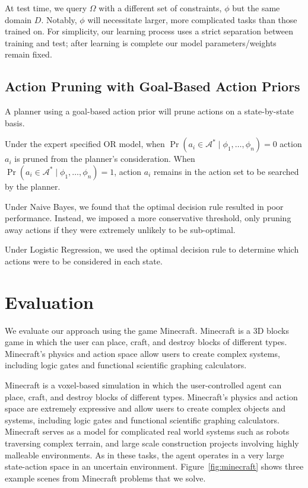 \documentclass[11pt]{article}
\begin{document}
At test time, we query $\Omega$ with a different set of constraints, $\phi$ but the same domain $D$. Notably, $\phi$ will necessitate larger, more complicated tasks than those trained on. For simplicity, our learning process uses a strict separation between training and test; after learning is complete our model parameters/weights remain fixed.

\subsection{Action Pruning with Goal-Based Action Priors}
\label{sec:action_pruning}
A planner using a goal-based action prior will prune actions on a state-by-state basis. 

Under the expert specified OR model, when $\Pr(a_i \in \mathcal{A}^*  \mid \phi_1, \ldots, \phi_n) = 0$
action $a_i$ is pruned from the planner's consideration. When
$\Pr(a_i \in \mathcal{A}^*  \mid \phi_1, \ldots, \phi_n) = 1$,
action $a_i$ remains in the action set to be searched by the planner.

Under Naive Bayes, we found that the optimal decision rule resulted in poor performance. Instead, we imposed a more conservative threshold, only pruning away actions if they were extremely unlikely to be sub-optimal.

Under Logistic Regression, we used the optimal decision rule to determine which actions were to be considered in each state.


\section{Evaluation}
\label{sec:evaluation}

We evaluate our approach using the game Minecraft. Minecraft is a 3D blocks game in which the
user can place, craft, and destroy blocks of different types.
Minecraft's physics and action space allow users to create complex
systems, including logic gates and functional scientific graphing
calculators.

Minecraft is a voxel-based simulation in which the user-controlled agent can place, craft, and destroy blocks of different types.
Minecraft's physics and action space are extremely expressive and allow users to create complex objects and systems, including logic gates and functional scientific graphing calculators.
Minecraft serves as a model for complicated real world systems such as robots traversing complex terrain, and large scale construction projects involving highly malleable environments.  As in these tasks, the agent operates in a very large state-action space in an uncertain environment. Figure~\ref{fig:minecraft} shows three example scenes from Minecraft problems that we solve.
\end{document}
